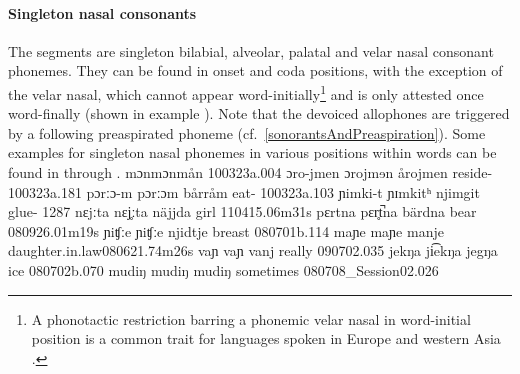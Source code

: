 \FB

\paragraph{Singleton nasal consonants}
The segments  are singleton bilabial, alveolar, palatal and velar nasal consonant phonemes. 
They can be found in onset and coda positions, with the exception of the velar nasal, which cannot appear word-initially\footnote{A phonotactic restriction barring a phonemic velar nasal in word-initial position is a common trait for languages spoken in Europe and western Asia \citep[cf.][]{Anderson2008a}.} 
and is only attested once word-finally (shown in example ). 
Note that the devoiced allophones are triggered by a following preaspirated phoneme (cf.~\SEC\ref{sonorantsAndPreaspiration}).
Some examples for singleton nasal phonemes in various positions within words can be found in  through .  
			{{m}ɔ{n}}{{m}ɔ{n}}{mån}	{}			{100323a}{.004}
		{ɔro-j{m}en}	{ɔroj{m}ɘn}	{årojmen}	{reside-}		{100323a}{.181}
				{pɔrːɔ-{m}}	{pɔrːɔ{m}}	{bårråm}	{eat-}			{100323a}{.103}
				{ɲi{m}ki-t}		{ɲɪ{m}kitʰ}	{njimgit}	{glue-}			{1287}
			{{n}ɛjːta}		{{n}ɛj̥ːta}		{näjjda}	{girl\BS{}}		{110415}{.06m31s}
			{pɛrt{n}a}		{pɛr̥t̚{n}a}		{bärdna}	{bear\BS{}}		{080926}{.01m19s}
		{{ɲ}iʧːe}		{{ɲ}iʧːe}		{njidtje}	{breast\BS{}}	{080701b}{.114}
	{ma{ɲ}e}		{ma{ɲ}e}		{manje}	{daughter.in.law\BS{}}{080621}{.74m26s}
				{va{ɲ}}		{va{ɲ}}		{vanj}	{really}					{090702}{.035}
			{jek{ŋ}a}		{ji͡ek{ŋ}a}		{jegŋa}	{ice\BS{}}		{080702b}{.070}
	{mudi{ŋ}}		{mudi{ŋ}}		{mudiŋ}	{sometimes}			{080708\_Session02}{.026}%

